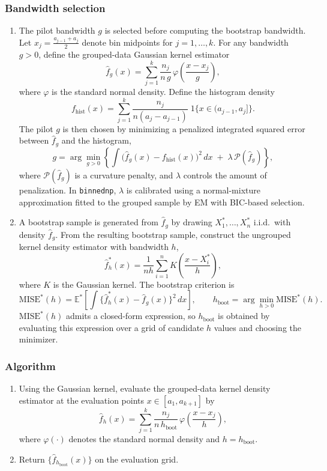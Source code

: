 \documentclass[12pt]{article} %
\begin{document}
\subsubsection*{Bandwidth selection}
\begin{enumerate}

\item The pilot bandwidth $g$ is selected before computing the bootstrap bandwidth. Let $x_j=\frac{a_{j-1}+a_j}{2}$ denote bin midpoints for $j = 1,\ldots,k$. For any bandwidth $g>0$, define the grouped-data Gaussian kernel estimator
\[
\hat f_g(x)=\sum_{j=1}^k \frac{n_j}{n\,g}\,\varphi\!\left(\frac{x-x_j}{g}\right),
\]
where $\varphi$ is the standard normal density. Define the histogram density
\[
f_{\mathrm{hist}}(x)=\sum_{j=1}^k \frac{n_j}{n(a_j-a_{j-1})}\;1\{x\in (a_{j-1},a_j]\}.
\]
The pilot $g$ is then chosen by minimizing a penalized integrated squared error between $\hat f_g$ and the histogram,
\[
g=\arg\min_{g>0}\left\{\int \big(\hat f_g(x)-f_{\mathrm{hist}}(x)\big)^2\,dx \;+\; \lambda\,\mathcal{P}(\hat f_g)\right\},
\]
where $\mathcal{P}(\hat f_g)$ is a curvature penalty, and $\lambda$ controls the amount of penalization. In \texttt{binnednp}, $\lambda$ is calibrated using a normal-mixture approximation fitted to the grouped sample by EM with BIC-based selection.

\item A bootstrap sample is generated from $\hat f_g$ by drawing $X_1^{*},\ldots,X_n^{*}$ i.i.d.\ with density $\hat f_g$. From the resulting bootstrap sample, construct the ungrouped kernel density estimator with bandwidth $h$,
\[
\hat f_h^{*}(x)=\frac{1}{n h}\sum_{i=1}^n K\!\left(\frac{x-X_i^{*}}{h}\right),
\]
where $K$ is the Gaussian kernel. The bootstrap criterion is
\[
\mathrm{MISE}^{*}(h)=\mathbb{E}^{*}\!\left[\int\{\hat f_h^{*}(x)-\hat f_g(x)\}^2\,dx\right],
\qquad 
h_{\mathrm{boot}}=\arg\min_{h>0}\mathrm{MISE}^{*}(h).
\]
$\mathrm{MISE}^{*}(h)$ admits a closed-form expression, so $h_{\mathrm{boot}}$ is obtained by evaluating this expression over a grid of candidate $h$ values and choosing the minimizer. 


\end{enumerate}


\subsubsection*{Algorithm}
\begin{enumerate}
\item Using the Gaussian kernel, evaluate the grouped-data kernel density estimator at the evaluation points $x \in [a_1,a_{k+1}]$ by
\[
\hat f_h(x)
= \sum_{j=1}^k \frac{n_j}{n\,h_{\mathrm{boot}}}\,\varphi\!\left(\frac{x-x_j}{h}\right),
\]
where $\varphi(\cdot)$ denotes the standard normal density and $h=h_{\mathrm{boot}}$.
\item Return $\{\hat f_{h_{\mathrm{boot}}}(x)\}$ on the evaluation grid.
\end{enumerate}
\end{document}
